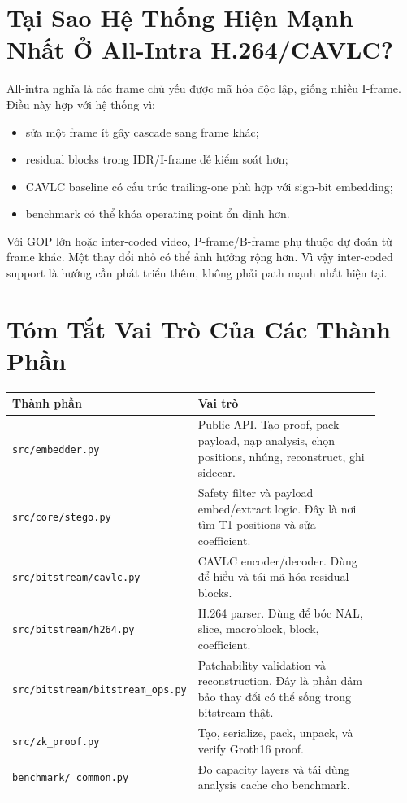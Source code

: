 \documentclass[11pt,a4paper]{article}
\begin{document}
\section{Tại Sao Hệ Thống Hiện Mạnh Nhất Ở All-Intra H.264/CAVLC?}

All-intra nghĩa là các frame chủ yếu được mã hóa độc lập, giống nhiều I-frame.
Điều này hợp với hệ thống vì:

\begin{itemize}[leftmargin=*]
  \item sửa một frame ít gây cascade sang frame khác;
  \item residual blocks trong IDR/I-frame dễ kiểm soát hơn;
  \item CAVLC baseline có cấu trúc trailing-one phù hợp với sign-bit embedding;
  \item benchmark có thể khóa operating point ổn định hơn.
\end{itemize}

Với GOP lớn hoặc inter-coded video, P-frame/B-frame phụ thuộc dự đoán từ frame
khác. Một thay đổi nhỏ có thể ảnh hưởng rộng hơn. Vì vậy inter-coded support là
hướng cần phát triển thêm, không phải path mạnh nhất hiện tại.

\section{Tóm Tắt Vai Trò Của Các Thành Phần}

\begin{center}
\begin{tabular}{p{0.28\linewidth}p{0.62\linewidth}}
\toprule
Thành phần & Vai trò \\
\midrule
\texttt{src/embedder.py} &
Public API. Tạo proof, pack payload, nạp analysis, chọn positions, nhúng, reconstruct, ghi sidecar. \\

\texttt{src/core/stego.py} &
Safety filter và payload embed/extract logic. Đây là nơi tìm T1 positions và sửa coefficient. \\

\texttt{src/bitstream/cavlc.py} &
CAVLC encoder/decoder. Dùng để hiểu và tái mã hóa residual blocks. \\

\texttt{src/bitstream/h264.py} &
H.264 parser. Dùng để bóc NAL, slice, macroblock, block, coefficient. \\

\texttt{src/bitstream/bitstream\_ops.py} &
Patchability validation và reconstruction. Đây là phần đảm bảo thay đổi có thể sống trong bitstream thật. \\

\texttt{src/zk\_proof.py} &
Tạo, serialize, pack, unpack, và verify Groth16 proof. \\

\texttt{benchmark/\_common.py} &
Đo capacity layers và tái dùng analysis cache cho benchmark. \\
\bottomrule
\end{tabular}
\end{center}
\end{document}
